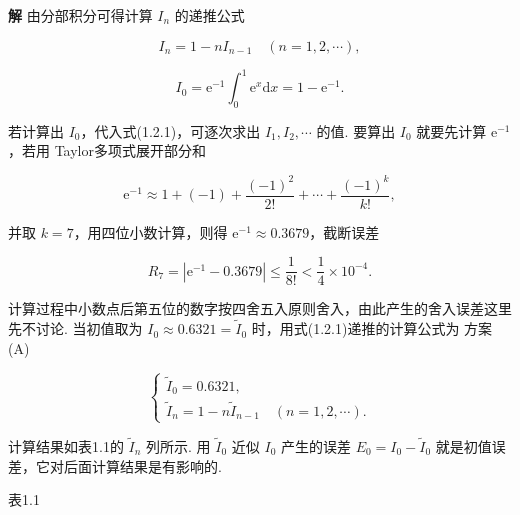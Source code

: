 \documentclass[
  10pt,
  a4paper,
]{article}
\begin{document}
\textbf{解} 由分部积分可得计算 \(I_n\) 的递推公式

\[
I_n = 1 - n I_{n-1} \quad (n = 1,2,\cdots), \tag{1.2.1}
\]

\[
I_0 = \mathrm{e}^{-1} \int_{0}^{1} \mathrm{e}^{x} \mathrm{d}x = 1 - \mathrm{e}^{-1}.
\]

若计算出 \(I_0\)，代入式(1.2.1)，可逐次求出 \(I_1, I_2, \cdots\) 的值.
要算出 \(I_0\) 就要先计算 \(\mathrm{e}^{-1}\)，若用
Taylor多项式展开部分和

\[
\mathrm{e}^{-1} \approx 1 + (-1) + \frac{(-1)^2}{2!} + \cdots + \frac{(-1)^k}{k!},
\]

并取 \(k=7\)，用四位小数计算，则得
\(\mathrm{e}^{-1} \approx 0.3679\)，截断误差

\[
R_7 = |\mathrm{e}^{-1} - 0.3679| \leqslant \frac{1}{8!} < \frac{1}{4} \times 10^{-4}.
\]

计算过程中小数点后第五位的数字按四舍五入原则舍入，由此产生的舍入误差这里先不讨论.
当初值取为 \(I_0 \approx 0.6321 = \tilde{I}_0\)
时，用式(1.2.1)递推的计算公式为 方案(A)

\[
\begin{cases}
\tilde{I}_0 = 0.6321, \\
\tilde{I}_n = 1 - n \tilde{I}_{n-1} \quad (n = 1,2,\cdots).
\end{cases}
\]

计算结果如表1.1的 \(\tilde{I}_n\) 列所示. 用 \(\tilde{I}_0\) 近似
\(I_0\) 产生的误差 \(E_0 = I_0 - \tilde{I}_0\)
就是初值误差，它对后面计算结果是有影响的.

表1.1
\end{document}
